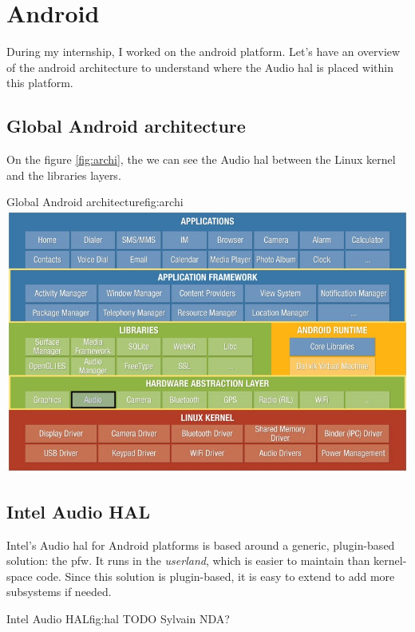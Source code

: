 \section{Android}
During my internship, I worked on the \gls{android} platform.
Let's have an overview of the \gls{android} architecture to understand where
the Audio \gls{hal} is placed within this platform.

\subsection{Global Android architecture}

On the figure \ref{fig:archi}, the we can see the Audio \gls{hal} between the
Linux \gls{kernel} and the libraries layers.
\begin{figureGraphics}{Global Android architecture}{fig:archi}
\includegraphics[width=\textwidth]{./src/img/android-archi-audio-hal.jpeg}
\end{figureGraphics}

\subsection{Intel Audio HAL}
Intel's Audio \gls{hal} for Android platforms is based around a generic, plugin-based solution: the \gls{pfw}.
It runs in the \emph{userland}, which is easier to maintain than kernel-space code.
Since this solution is plugin-based, it is easy to extend to add more subsystems if needed.

\begin{figureGraphics}{Intel Audio HAL}{fig:hal}
    TODO Sylvain NDA?
\end{figureGraphics}

